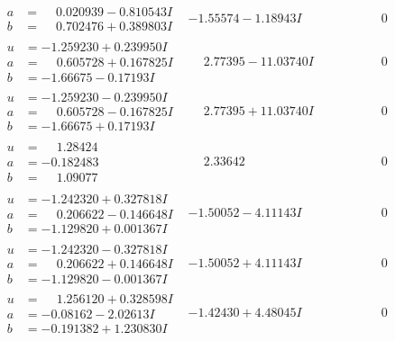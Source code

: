 \documentclass[1p]{elsarticle_modified}
\theoremstyle{definition}
\begin{document}
$$\begin{array}{c|c|c}
\begin{aligned}
a &= \phantom{-}0.020939 - 0.810543 I \\
b &= \phantom{-}0.702476 + 0.389803 I\end{aligned}
 & -1.55574 - 1.18943 I & \phantom{-0.000000 } 0 \\ \hline\begin{aligned}
u &= -1.259230 + 0.239950 I \\
a &= \phantom{-}0.605728 + 0.167825 I \\
b &= -1.66675 - 0.17193 I\end{aligned}
 & \phantom{-}2.77395 - 11.03740 I & \phantom{-0.000000 } 0 \\ \hline\begin{aligned}
u &= -1.259230 - 0.239950 I \\
a &= \phantom{-}0.605728 - 0.167825 I \\
b &= -1.66675 + 0.17193 I\end{aligned}
 & \phantom{-}2.77395 + 11.03740 I & \phantom{-0.000000 } 0 \\ \hline\begin{aligned}
u &= \phantom{-}1.28424\phantom{ +0.000000I} \\
a &= -0.182483\phantom{ +0.000000I} \\
b &= \phantom{-}1.09077\phantom{ +0.000000I}\end{aligned}
 & \phantom{-}2.33642\phantom{ +0.000000I} & \phantom{-0.000000 } 0 \\ \hline\begin{aligned}
u &= -1.242320 + 0.327818 I \\
a &= \phantom{-}0.206622 - 0.146648 I \\
b &= -1.129820 + 0.001367 I\end{aligned}
 & -1.50052 - 4.11143 I & \phantom{-0.000000 } 0 \\ \hline\begin{aligned}
u &= -1.242320 - 0.327818 I \\
a &= \phantom{-}0.206622 + 0.146648 I \\
b &= -1.129820 - 0.001367 I\end{aligned}
 & -1.50052 + 4.11143 I & \phantom{-0.000000 } 0 \\ \hline\begin{aligned}
u &= \phantom{-}1.256120 + 0.328598 I \\
a &= -0.08162 - 2.02613 I \\
b &= -0.191382 + 1.230830 I\end{aligned}
 & -1.42430 + 4.48045 I & \phantom{-0.000000 } 0\\

\end{array}$$
\end{document}
